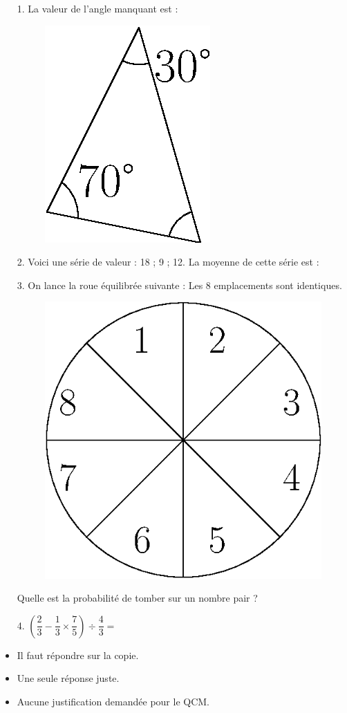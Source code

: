 \begin{multicols}{2}

    \begin{enumerate}
        \item[1.] La valeur de l’angle manquant est :
        \begin{figure}[H]
            \centering
            \includegraphics[width=0.2\linewidth]{qcm1.eps}
        \end{figure}

        \item[2.] Voici une série de valeur : 18 ; 9 ; 12. \newline 
        La moyenne de cette série est : 

        \item[3.] On lance la roue équilibrée suivante : \newline 
        Les 8 emplacements sont identiques.
        \begin{figure}[H]
            \centering
            \includegraphics[width=0.2\linewidth]{qcm3.eps}
        \end{figure}
        Quelle est la probabilité de tomber sur un nombre pair ? 
        \item[4.] $\left( \dfrac{2}{3} - \dfrac{1}{3} \times \dfrac{7}{5} \right) \div \dfrac{4}{3} = $
    \end{enumerate} \columnbreak
    
    \begin{itemize}[label={$\bullet$}]
        \item Il faut répondre sur la copie. 
        \item Une seule réponse juste.
        \item Aucune justification demandée pour le QCM.
    \end{itemize}


\end{multicols}
